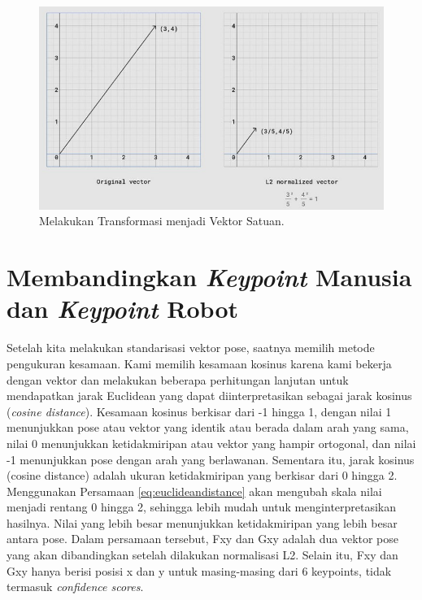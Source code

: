 \begin{figure}[ht]
  \centering
  \includegraphics[scale=0.65]{gambar/transform-to-unit-vector.png}
  \caption{Melakukan Transformasi menjadi Vektor Satuan.}
  \label{fig:transforming-into-unit-vector}
\end{figure}

\section{Membandingkan \textit{Keypoint} Manusia dan \textit{Keypoint} Robot}
\label{sec:comparing-keypoints}

Setelah kita melakukan standarisasi vektor pose, saatnya memilih metode pengukuran kesamaan. Kami memilih kesamaan kosinus karena kami bekerja dengan vektor dan melakukan beberapa perhitungan lanjutan untuk mendapatkan jarak Euclidean yang dapat diinterpretasikan sebagai jarak kosinus (\textit{cosine distance}).
Kesamaan kosinus berkisar dari -1 hingga 1, dengan nilai 1 menunjukkan pose atau vektor yang identik atau berada dalam arah yang sama, nilai 0 menunjukkan ketidakmiripan atau vektor yang hampir ortogonal, dan nilai -1 menunjukkan pose dengan arah yang berlawanan. Sementara itu, jarak kosinus (cosine distance) adalah ukuran ketidakmiripan yang berkisar dari 0 hingga 2.
Menggunakan Persamaan \ref{eq:euclideandistance} akan mengubah skala nilai menjadi rentang 0 hingga 2, sehingga lebih mudah untuk menginterpretasikan hasilnya. Nilai yang lebih besar menunjukkan ketidakmiripan yang lebih besar antara pose. Dalam persamaan tersebut, Fxy dan Gxy adalah dua vektor pose yang akan dibandingkan setelah dilakukan normalisasi L2. Selain itu, Fxy dan Gxy hanya berisi posisi x dan y untuk masing-masing dari 6 keypoints, tidak termasuk \textit{confidence scores}.

